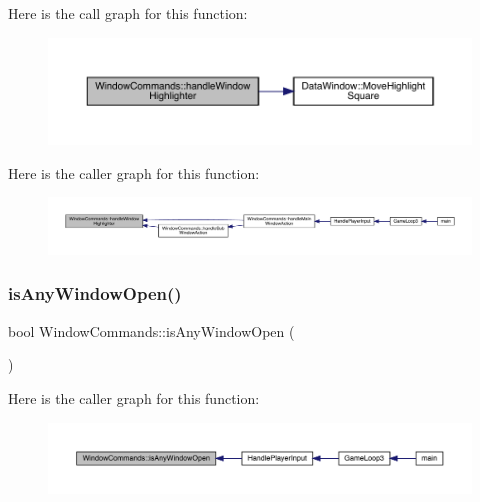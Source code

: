 Here is the call graph for this function\+:
\nopagebreak
\begin{figure}[H]
\begin{center}
\leavevmode
\includegraphics[width=350pt]{da/d07/class_window_commands_a579bde80c82ababdcdbf271ccefd30b5_cgraph}
\end{center}
\end{figure}
Here is the caller graph for this function\+:
\nopagebreak
\begin{figure}[H]
\begin{center}
\leavevmode
\includegraphics[width=350pt]{da/d07/class_window_commands_a579bde80c82ababdcdbf271ccefd30b5_icgraph}
\end{center}
\end{figure}
\mbox{\label{class_window_commands_a3a551cd38ac62e1644cef2f95d748bdd}} 
\subsubsection{\texorpdfstring{is\+Any\+Window\+Open()}{isAnyWindowOpen()}}
{\footnotesize\ttfamily bool Window\+Commands\+::is\+Any\+Window\+Open (\begin{DoxyParamCaption}{ }\end{DoxyParamCaption})}

Here is the caller graph for this function\+:
\nopagebreak
\begin{figure}[H]
\begin{center}
\leavevmode
\includegraphics[width=350pt]{da/d07/class_window_commands_a3a551cd38ac62e1644cef2f95d748bdd_icgraph}
\end{center}
\end{figure}
\mbox{\label{class_window_commands_a4a688b109ea4eff83b5ae43bb1f93e50}} 
